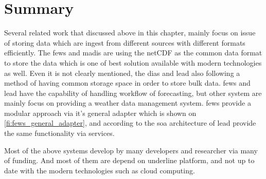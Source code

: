 \section{Summary}
\label{se:lit_summary}
Several related work that discussed above in this chapter, mainly focus on issue of storing data which are ingest from different sources with different formats efficiently. The \acrshort{fews} and \acrshort{madis} are using the \acrshort{netCDF} as the common data format to store the data which is one of best solution available with modern technologies as well. Even it is not clearly mentioned, the \acrshort{dias} and \acrshort{lead} also following a method of having common storage space in order to store bulk data.
\acrshort{fews} and \acrshort{lead} have the capability of handling workflow of forecasting, but other system are mainly focus on providing a weather data management system.
\acrshort{fews} provide a modular approach via it's general adapter which is shown on \cref{fi:fews_general_adapter}, and according to the \acrshort{soa} architecture of \acrshort{lead} provide the same functionality via services.

Most of the above systems develop by many developers and researcher via many of funding. And most of them are depend on underline platform, and not up to date with the modern technologies such as cloud computing.
